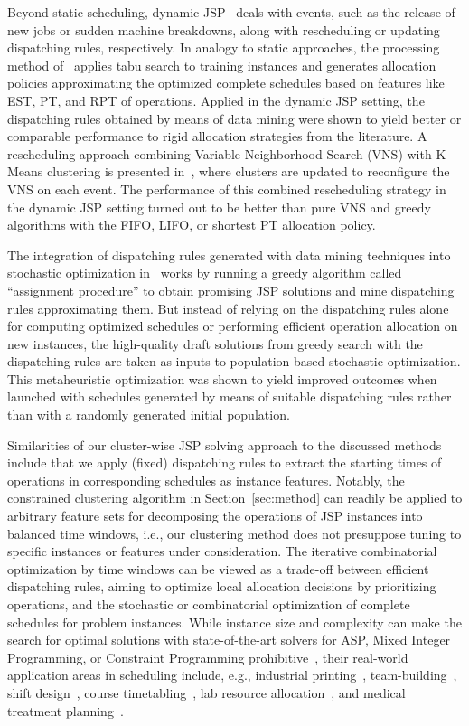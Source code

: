 \documentclass[runningheads]{llncs}
\begin{document}
Beyond static scheduling, dynamic JSP~\cite{french82a} deals with events, such as 
the release of new jobs or sudden machine breakdowns, along with rescheduling or
updating dispatching rules, respectively.
In analogy to static approaches,
the processing method of~\cite{shahzad2010discovering} applies tabu search to
training instances and generates allocation policies approximating the optimized
complete schedules based on features like EST, PT, and RPT of operations.
Applied in the dynamic JSP setting, the dispatching rules obtained by means of data mining
were shown to yield better or comparable performance to rigid allocation strategies from the
literature.
A rescheduling approach combining Variable Neighborhood Search (VNS)
with K-Means clustering is presented in~\cite{adibi2014clustering},
where clusters are updated to reconfigure the VNS on each event.
The performance of this combined rescheduling strategy in the dynamic JSP setting turned out
to be better than pure VNS and greedy algorithms with the FIFO, LIFO, or
shortest PT allocation policy.

The integration of dispatching rules generated with data mining techniques
into stochastic optimization in~\cite{nasiri2019data} works by
running a greedy algorithm called ``assignment procedure'' to obtain promising
JSP solutions and mine dispatching rules approximating them.
But instead of relying on the dispatching rules alone for computing optimized
schedules or performing efficient operation allocation on new instances,
the high-quality draft solutions from greedy search with the dispatching rules
are taken as inputs to population-based stochastic optimization.
This metaheuristic optimization was shown to yield improved outcomes when launched
with schedules generated by means of suitable dispatching rules rather than with
a randomly generated initial population.

Similarities of our cluster-wise JSP solving approach to the discussed methods include
that we apply (fixed) dispatching rules to extract the starting times of operations
in corresponding schedules as instance features.
Notably, the constrained clustering algorithm in Section~\ref{sec:method} can readily
be applied to arbitrary feature sets for decomposing the operations of JSP instances
into balanced time windows, i.e., our clustering method does not presuppose tuning to
specific instances or features under consideration.
The iterative combinatorial optimization by time windows can be viewed as a trade-off
between efficient dispatching rules, aiming to optimize local allocation decisions by
prioritizing operations, and the stochastic or combinatorial optimization of
complete schedules for problem instances.
While instance size and complexity can make the search for optimal solutions
with state-of-the-art solvers for ASP, Mixed Integer Programming, or Constraint Programming
prohibitive~\cite{zhang2010hybrid},
their real-world application areas in scheduling include, e.g.,
industrial printing~\cite{balduccini11a},
team-building~\cite{rigralmaliiile12a},
shift design~\cite{abgemuscwo15c},
course timetabling~\cite{bainkaokscsotawa18a},
lab resource allocation~\cite{frscel21a},
and
medical treatment planning~\cite{dogagrmamopo21a}.
\end{document}
